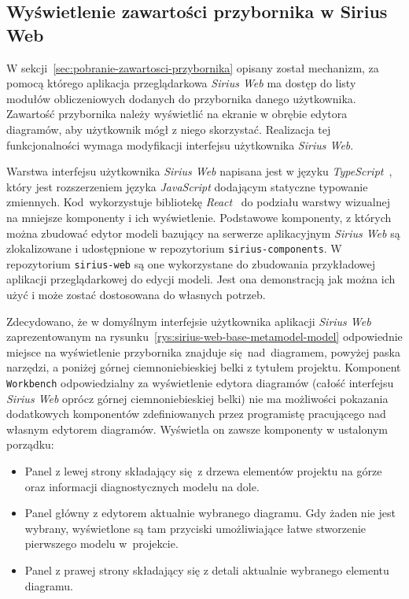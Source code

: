 \subsection{Wyświetlenie zawartości przybornika w Sirius Web}

W sekcji~\ref{sec:pobranie-zawartosci-przybornika} opisany został mechanizm, za
pomocą którego aplikacja przeglądarkowa \emph{Sirius Web} ma dostęp do listy
modułów obliczeniowych dodanych do przybornika danego użytkownika. Zawartość
przybornika należy wyświetlić na ekranie w obrębie edytora diagramów, aby
użytkownik mógł z niego skorzystać. Realizacja tej funkcjonalności wymaga
modyfikacji interfejsu użytkownika \emph{Sirius Web}.

Warstwa interfejsu użytkownika \emph{Sirius Web} napisana jest w języku
\emph{TypeScript}~\cite{typescript-homepage}, który jest rozszerzeniem języka
\emph{JavaScript} dodającym
statyczne typowanie zmiennych. Kod~wykorzystuje bibliotekę
\emph{React}~\cite{react-homepage} do podziału warstwy wizualnej na mniejsze
komponenty i ich wyświetlenie. Podstawowe komponenty, z których można zbudować
edytor modeli bazujący na serwerze aplikacyjnym \emph{Sirius Web} są
zlokalizowane i udostępnione w repozytorium \texttt{sirius-components}.
W repozytorium \texttt{sirius-web} są one wykorzystane do zbudowania
przykładowej aplikacji przeglądarkowej do edycji modeli.
Jest ona demonstracją jak można ich użyć i może zostać dostosowana do własnych
potrzeb.

Zdecydowano, że w domyślnym interfejsie użytkownika aplikacji \emph{Sirius Web}
zaprezentowanym na rysunku~\ref{rys:sirius-web-base-metamodel-model}
odpowiednie miejsce na wyświetlenie przybornika znajduje się~nad~diagramem,
powyżej paska narzędzi, a poniżej górnej ciemnoniebieskiej belki z tytułem
projektu. Komponent \texttt{Workbench} odpowiedzialny za wyświetlenie edytora
diagramów (całość
interfejsu \emph{Sirius Web} oprócz górnej ciemnoniebieskiej belki) nie
ma możliwości pokazania dodatkowych komponentów zdefiniowanych przez
programistę pracującego nad własnym edytorem diagramów. Wyświetla on zawsze
komponenty w ustalonym porządku:

\begin{itemize}
	\item Panel z lewej strony składający się z drzewa elementów projektu na górze oraz informacji diagnostycznych modelu na dole.
	\item Panel główny z edytorem aktualnie wybranego diagramu. Gdy żaden nie jest wybrany, wyświetlone są tam przyciski umożliwiające łatwe stworzenie pierwszego modelu w~projekcie.
	\item Panel z prawej strony składający się z detali aktualnie wybranego elementu diagramu.
\end{itemize}

